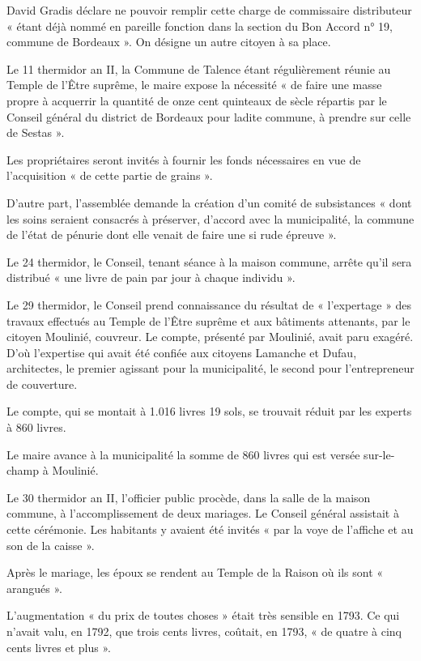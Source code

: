 \documentclass[a4paper,11pt]{book}
\begin{document}
David Gradis déclare ne pouvoir remplir cette charge de commissaire distributeur « étant déjà nommé en pareille fonction dans la section du Bon Accord n° 19, commune de Bordeaux ». On désigne un autre citoyen à sa place.

Le 11 thermidor an II, la Commune de Talence étant régulièrement réunie au Temple de l'Être suprême, le maire expose la nécessité « de faire une masse propre à acquerrir la quantité de onze cent quinteaux de sècle répartis par le Conseil général du district de Bordeaux pour ladite commune, à prendre sur celle de Sestas ».

Les propriétaires seront invités à fournir les fonds nécessaires en vue de l'acquisition « de cette partie de grains ».

D'autre part, l'assemblée demande la création d'un comité de subsistances « dont les soins seraient consacrés à préserver, d'accord avec la municipalité, la commune de l'état de pénurie dont elle venait de faire une si rude épreuve ».

Le 24 thermidor, le Conseil, tenant séance à la maison commune, arrête qu'il sera distribué « une livre de pain par jour à chaque individu ».

Le 29 thermidor, le Conseil prend connaissance du résultat de « l'expertage » des travaux effectués au Temple de l'Être suprême et aux bâtiments attenants, par le citoyen Moulinié, couvreur. Le compte, présenté par Moulinié, avait paru exagéré. D'où l'expertise qui avait été confiée aux citoyens Lamanche et Dufau, architectes, le premier agissant pour la municipalité, le second pour l'entrepreneur de couverture.

Le compte, qui se montait à 1.016 livres 19 sols, se trouvait réduit par les experts à 860 livres.

Le maire avance à la municipalité la somme de 860 livres qui est versée sur-le-champ à Moulinié. 

Le 30 thermidor an II, l'officier public procède, dans la salle de la maison commune, à l'accomplissement de deux mariages. Le Conseil général assistait à cette cérémonie. Les habitants y avaient été invités « par la voye de l'affiche et au son de la caisse ».

Après le mariage, les époux se rendent au Temple de la Raison où ils sont « arangués ».

L'augmentation « du prix de toutes choses » était très sensible en 1793. Ce qui n'avait valu, en 1792, que trois cents livres, coûtait, en 1793, « de quatre à cinq cents livres et plus ».
\end{document}
